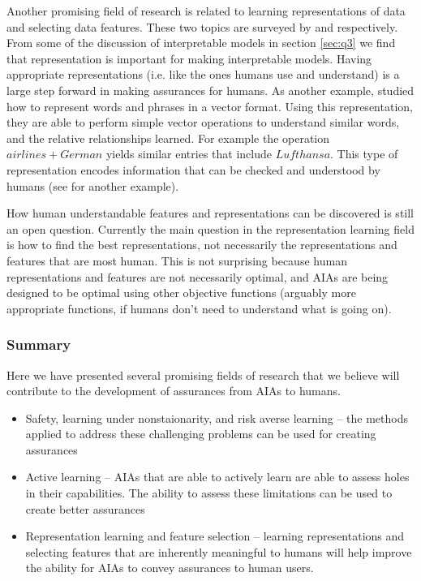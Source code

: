     Another promising field of research is related to learning representations of data and selecting data features. These two topics are surveyed by \citet{Bengio2013-uv} and \citet{Guyon2003-fj} respectively. From some of the discussion of interpretable models in section \ref{sec:q3} we find that representation is important for making interpretable models. Having appropriate representations (i.e. like the ones humans use and understand) is a large step forward in making assurances for humans. As another example, \citet{Mikolov2013-lt} studied how to represent words and phrases in a vector format. Using this representation, they are able to perform simple vector operations to understand similar words, and the relative relationships learned. For example the operation $airlines+German$ yields similar entries that include $Lufthansa$. This type of representation encodes information that can be checked and understood by humans (see \cite{Haury2011-zi} for another example).
    
    How human understandable features and representations can be discovered is still an open question. Currently the main question in the representation learning field is how to find the best representations, not necessarily the representations and features that are most human. This is not surprising because human representations and features are not necessarily optimal, and AIAs are being designed to be optimal using other objective functions (arguably more appropriate functions, if humans don't need to understand what is going on).

\subsubsection{Summary}
    Here we have presented several promising fields of research that we believe will contribute to the development of assurances from AIAs to humans.
    \begin{itemize}
        \item Safety, learning under nonstaionarity, and risk averse learning -- the methods applied to address these challenging problems can be used for creating assurances
        \item Active learning -- AIAs that are able to actively learn are able to assess holes in their capabilities. The ability to assess these limitations can be used to create better assurances
        \item Representation learning and feature selection -- learning representations and selecting features that are inherently meaningful to humans will help improve the ability for AIAs to convey assurances to human users.
    \end{itemize}

